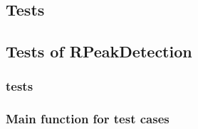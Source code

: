 \documentclass[12pt,a4paper]{article}
\begin{document}
\subsection{Tests}
\subsection{Tests of RPeakDetection}
%	
\subsubsection{tests}
%	
\subsubsection{Main function for test cases}
%	
\end{document}
